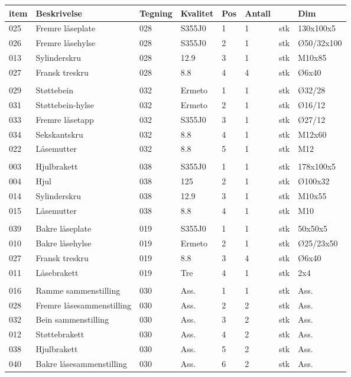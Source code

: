 \clearpage
\begin{tabular}{|l|l|l|l|l|l|l|l|}
\hline
\bf{item} & \bf{Beskrivelse} & \bf{Tegning} & \bf{Kvalitet} & \bf{Pos} & \bf{Antall} &  & \bf{Dim}\\ \hline
025 & Fremre låseplate & 028 & S355J0 & 1 & 1 & stk & 130x100x5\\ \hline
026 & Fremre låsehylse & 028 & S355J0 & 2 & 1 & stk & Ø50/32x100\\ \hline
013 & Sylinderskru & 028 & 12.9 & 3 & 1 & stk & M10x85\\ \hline
027 & Fransk treskru & 028 & 8.8 & 4 & 4 & stk & Ø6x40\\ \hline
 &  &  &  &  &  &  & \\ \hline
029 & Støttebein & 032 & Ermeto & 1 & 1 & stk & Ø32/28\\ \hline
031 & Støttebein-hylse & 032 & Ermeto & 2 & 1 & stk & Ø16/12\\ \hline
033 & Fremre låsetapp & 032 & S355J0 & 3 & 1 & stk & Ø27/12\\ \hline
034 & Sekskantskru & 032 & 8.8 & 4 & 1 & stk & M12x60\\ \hline
022 & Låsemutter & 032 & 8.8 & 5 & 1 & stk & M12\\ \hline
 &  &  &  &  &  &  & \\ \hline
003 & Hjulbrakett & 038 & S355J0 & 1 & 1 & stk & 178x100x5\\ \hline
004 & Hjul & 038 & 125 & 2 & 1 & stk & Ø100x32\\ \hline
014 & Sylinderskru & 038 & 12.9 & 3 & 1 & stk & M10x55\\ \hline
015 & Låsemutter & 038 & 8.8 & 4 & 1 & stk & M10\\ \hline
 &  &  &  &  &  &  & \\ \hline
039 & Bakre låseplate & 019 & S355J0 & 1 & 1 & stk & 50x50x5\\ \hline
010 & Bakre låsehylse & 019 & Ermeto & 2 & 1 & stk & Ø25/23x50\\ \hline
027 & Fransk treskru & 019 & 8.8 & 3 & 4 & stk & Ø6x40\\ \hline
011 & Låsebrakett & 019 & Tre & 4 & 1 & stk & 2x4\\ \hline
 &  &  &  &  &  &  & \\ \hline
016 & Ramme sammenstilling & 030 & Ass. & 1 & 1 & stk & Ass.\\ \hline
028 & Fremre låsesammenstilling & 030 & Ass. & 2 & 2 & stk & Ass.\\ \hline
032 & Bein sammenstilling & 030 & Ass. & 3 & 2 & stk & Ass.\\ \hline
012 & Støttebrakett & 030 & Ass. & 4 & 2 & stk & Ass.\\ \hline
038 & Hjulbrakett & 030 & Ass. & 5 & 2 & stk & Ass.\\ \hline
040 & Bakre låsesammenstilling & 030 & Ass. & 6 & 2 & stk & Ass.\\ \hline
\end{tabular}

